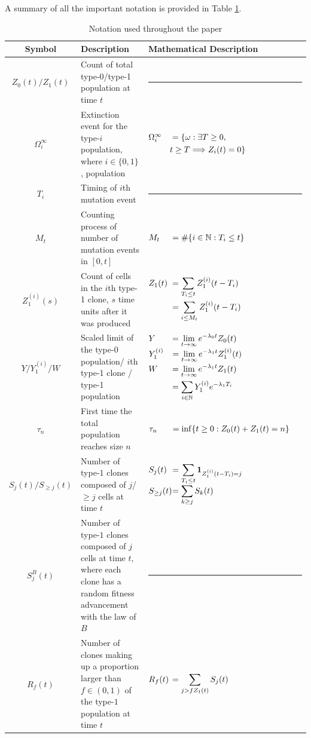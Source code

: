 \documentclass{article}
\numberwithin{equation}{section}
\newcommand{\tabeq}[3]{%
  \begin{aligned}[t]
    \makebox[#1][l]{$#2$} &= #3
  \end{aligned}%
}
\begin{document}
A summary of all the important notation is provided in Table \ref{table:notation}.
\begin{table}[H]
\renewcommand{\arraystretch}{1.5}
  \centering  
  \begin{tabular}{|c p{6cm} p{6cm}|}
\hline
\textbf{Symbol} & \textbf{Description} & \textbf{Mathematical Description}\\
\hline
$Z_0(t)/Z_1(t)$ & Count of total type-0/type-1 population at time $t$ & \rule[0.5ex]{1cm}{0.4pt}\\
$\Omega_i^\infty$ & Extinction event for the type-$i$ population, where $i\in \{0,1\}$, population & $\tabeq{0.9cm}{\Omega_i^\infty}{\{\omega:\exists T\geq 0,\\&t\geq T\Longrightarrow Z_i(t)=0\}}$\\
$T_i$ & Timing of $i$th mutation event & \rule[0.5ex]{1cm}{0.4pt}\\
$M_t$ & Counting process of number of mutation events in $[0,t]$ & $\tabeq{0.9cm}{M_t}{\#\{i\in \mathbb{N}:T_i\leq t\}}$\\
$Z_1^{(i)}(s)$ & Count of cells in the $i$th type-1 clone, $s$ time units after it was produced & $\tabeq{0.9cm}{Z_1(t)}{\sum_{T_i\leq t}Z_1^{(i)}(t-T_i)\\
       &= \sum_{i\leq M_t}Z_1^{(i)}(t-T_i)}$\\
$Y/Y_1^{(i)}/W$ & Scaled limit of the type-0 population/ $i$th type-1 clone / type-1 population &  $\tabeq{0.9cm}{Y}{\lim_{t\to\infty}e^{-\lambda_0 t}Z_0(t)}$\newline$\tabeq{0.9cm}{Y_1^{(i)}}{\lim_{t\to\infty}e^{-\lambda_1 t}Z_1^{(i)}(t)}$\newline$\tabeq{0.9cm}{W}{\lim_{t\to\infty} e^{-\lambda_1 t}Z_1(t)\\&=\sum_{i \in \mathbb{N}}Y_1^{(i)}e^{-\lambda_1 T_i}}$\\
$\tau_n$ & First time the total population reaches size $n$ & $\tabeq{0.9cm}{\tau_n}{\inf\{t\geq 0:Z_0(t)+Z_1(t)=n\}}$\\
$S_j(t)/S_{\geq j}(t)$ & Number of type-$1$ clones composed of $j$/$\geq j$ cells at time $t$ & $\tabeq{0.9cm}{S_j(t)}{\sum_{T_i\leq t}\mathbf{1}_{Z_1^{(i)}(t-T_i)=j}}$\newline$\tabeq{0.9cm}{S_{\geq j}(t)}{\sum_{k\geq j}S_k(t)}$\\
$S_j^B(t)$ & Number of type-$1$ clones composed of $j$ cells at time $t$, where each clone has a random fitness advancement with the law of $B$ & \rule[0.5ex]{1cm}{0.4pt}\\
$R_f(t)$ & Number of clones making up a proportion larger than $f\in (0,1)$ of the type-$1$ population at time $t$&$\tabeq{0.9cm}{R_f(t)}{\sum_{j>fZ_1(t)}S_j(t)}$\\
\hline
\end{tabular}
\caption{Notation used throughout the paper}\label{table:notation}
\end{table}
\end{document}
